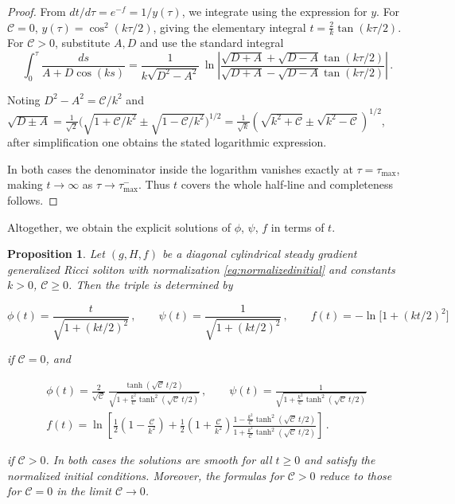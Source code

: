 \documentclass[12pt,a4paper,reqno]{amsart}
\theoremstyle{plain}
\newtheorem{proposition}[theorem]{Proposition}
\theoremstyle{remark}
\numberwithin{equation}{section}
\newcommand{\cC}{\mathcal{C}}
\begin{document}
\begin{proof}
From $dt/d\tau = e^{-f}=1/y(\tau)$, we integrate using the expression for $y$.  
For $\cC=0$, $y(\tau)=\cos^{2}(k\tau/2)$, giving the elementary integral $t = \frac{2}{k}\tan(k\tau/2)$.  
For $\cC>0$, substitute $A,D$ and use the standard integral
\begin{equation*}
\int_0^\tau \frac{ds}{A+D\cos(ks)} = \frac{1}{k\sqrt{D^{2}-A^{2}}}\,
\ln\left|\frac{\sqrt{D+A}+\sqrt{D-A}\tan(k\tau/2)}{\sqrt{D+A}-\sqrt{D-A}\tan(k\tau/2)}\right| \,.
\end{equation*}

Noting $D^{2}-A^{2}= \cC/k^{2}$ and $\sqrt{D\pm A}= \frac{1}{\sqrt{2}}\big( \sqrt{1+\cC/k^{2}} \pm \sqrt{1-\cC/k^{2}} \big)^{1/2}= \frac{1}{\sqrt{k}}(\sqrt{k^{2}+\cC}\pm\sqrt{k^{2}-\cC})^{1/2}$, after simplification one obtains the stated logarithmic expression.

In both cases the denominator inside the logarithm vanishes exactly at $\tau=\tau_{\max}$, making $t\to\infty$ as $\tau\to\tau_{\max}^{-}$.  Thus $t$ covers the whole half‑line and completeness follows.
\end{proof}

Altogether, we obtain the explicit solutions of $\phi$, $\psi$, $f$ in terms of $t$.

\begin{proposition}\label{prop:explicitphipsift}
Let $(g,H,f)$ be a diagonal cylindrical steady gradient generalized Ricci soliton with normalization \eqref{eq:normalizedinitial} and constants $k>0$, $\cC\ge 0$. Then the triple is determined by

\begin{equation}\label{eq:explicitsolutionstC0}
\phi(t) = \frac{t}{\sqrt{1 + (kt/2)^2}} \,, \qquad 
\psi(t) = \frac{1}{\sqrt{1 + (kt/2)^2}} \,, \qquad 
f(t) = - \ln\big[ 1 + (kt/2)^2 \big]
\end{equation}

if $\cC=0$, and

\begin{equation}\label{eq:explicitsolutionstCpos}
\begin{gathered}
\phi(t) = \frac{2}{\sqrt{\cC}}\,\frac{\tanh(\sqrt{\cC}\,t/2)}{\sqrt{1 + \frac{k^{2}}{\cC}\tanh^{2}(\sqrt{\cC}\,t/2)}} \,, \qquad \psi(t) = \frac{1}{\sqrt{1 + \frac{k^{2}}{\cC}\tanh^{2}(\sqrt{\cC}\,t/2)}} \, \\[6pt]
f(t) = \ln\left[\frac{1}{2}\left(1-\frac{\cC}{k^{2}}\right) + \frac{1}{2}\left(1+\frac{\cC}{k^{2}}\right)\frac{1 - \frac{k^{2}}{\cC}\tanh^{2}(\sqrt{\cC}\,t/2)}{1 + \frac{k^{2}}{\cC}\tanh^{2}(\sqrt{\cC}\,t/2)}
\right] \,.
\end{gathered}
\end{equation}

if $\cC>0$. In both cases the solutions are smooth for all $t\ge 0$ and satisfy the normalized initial conditions. Moreover, the formulas for $\cC>0$ reduce to those for $\cC=0$ in the limit $\cC\to 0$.
\end{proposition}
\end{document}
